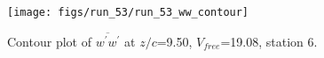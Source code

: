 \begin{figure}[H]
\centering
\texttt{[image: figs/run\_53/run\_53\_ww\_contour]}
\caption{Contour plot of $\overline{w^\prime w^\prime}$ at $z/c$=9.50, $V_{free}$=19.08, station 6.}
\label{fig:run_53_ww_contour}
\end{figure}


